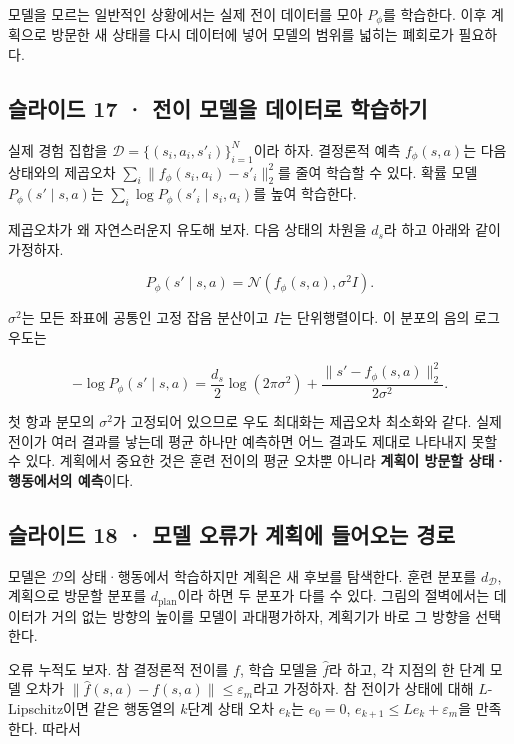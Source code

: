 \documentclass[11pt,a4paper]{article}
\begin{document}
모델을 모르는 일반적인 상황에서는 실제 전이 데이터를 모아 $P_\phi$를 학습한다. 이후 계획으로 방문한 새 상태를 다시 데이터에 넣어 모델의 범위를 넓히는 폐회로가 필요하다.\par

\subsection{슬라이드 17 · 전이 모델을 데이터로 학습하기}

실제 경험 집합을 $\mathcal D=\{(s_i,a_i,s'_i)\}_{i=1}^N$이라 하자. 결정론적 예측 $f_\phi(s,a)$는 다음 상태와의 제곱오차 $\sum_i\|f_\phi(s_i,a_i)-s'_i\|_2^2$를 줄여 학습할 수 있다. 확률 모델 $P_\phi(s'\mid s,a)$는 $\sum_i\log P_\phi(s'_i\mid s_i,a_i)$를 높여 학습한다.\par

제곱오차가 왜 자연스러운지 유도해 보자. 다음 상태의 차원을 $d_s$라 하고 아래와 같이 가정하자.\par

\[
P_\phi(s'\mid s,a)=\mathcal N\!\left(f_\phi(s,a),\sigma^2I\right).
\]

$\sigma^2$는 모든 좌표에 공통인 고정 잡음 분산이고 $I$는 단위행렬이다. 이 분포의 음의 로그우도는\par

\[
-\log P_\phi(s'\mid s,a)
=\frac{d_s}{2}\log(2\pi\sigma^2)
+\frac{\|s'-f_\phi(s,a)\|_2^2}{2\sigma^2}.
\]

첫 항과 분모의 $\sigma^2$가 고정되어 있으므로 우도 최대화는 제곱오차 최소화와 같다. 실제 전이가 여러 결과를 낳는데 평균 하나만 예측하면 어느 결과도 제대로 나타내지 못할 수 있다. 계획에서 중요한 것은 훈련 전이의 평균 오차뿐 아니라 \textbf{계획이 방문할 상태·행동에서의 예측}이다.\par

\subsection{슬라이드 18 · 모델 오류가 계획에 들어오는 경로}

모델은 $\mathcal D$의 상태·행동에서 학습하지만 계획은 새 후보를 탐색한다. 훈련 분포를 $d_{\mathcal D}$, 계획으로 방문할 분포를 $d_{\mathrm{plan}}$이라 하면 두 분포가 다를 수 있다. 그림의 절벽에서는 데이터가 거의 없는 방향의 높이를 모델이 과대평가하자, 계획기가 바로 그 방향을 선택한다.\par

오류 누적도 보자. 참 결정론적 전이를 $f$, 학습 모델을 $\hat f$라 하고, 각 지점의 한 단계 모델 오차가 $\|\hat f(s,a)-f(s,a)\|\le\varepsilon_m$라고 가정하자. 참 전이가 상태에 대해 $L$-Lipschitz이면 같은 행동열의 $k$단계 상태 오차 $e_k$는 $e_0=0$, $e_{k+1}\le L e_k+\varepsilon_m$을 만족한다. 따라서\par
\end{document}
